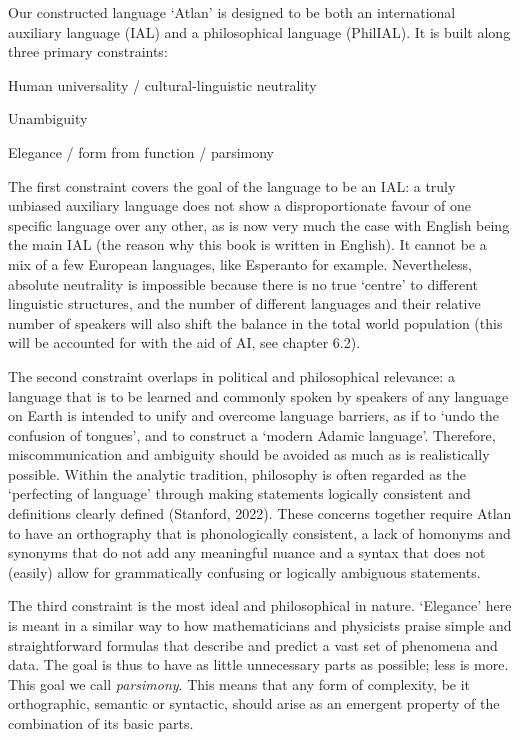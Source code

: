 Our constructed language ‘Atlan’ is designed to be both an international auxiliary language (IAL) and a philosophical language (PhilIAL). It is built along three primary constraints: 

\begin{enumerate}    
    \item {Human universality / cultural-linguistic neutrality 

    \item Unambiguity 

    \item Elegance / form from function / parsimony} 
\end{enumerate}

The first constraint covers the goal of the language to be an IAL: a truly unbiased auxiliary language does not show a disproportionate favour of one specific language over any other, as is now very much the case with English being the main IAL (the reason why this book is written in English). It cannot be a mix of a few European languages, like Esperanto for example. Nevertheless, absolute neutrality is impossible because there is no true ‘centre’ to different linguistic structures, and the number of different languages and their relative number of speakers will also shift the balance in the total world population (this will be accounted for with the aid of AI, see chapter 6.2). 

The second constraint overlaps in political and philosophical relevance: a language that is to be learned and commonly spoken by speakers of any language on Earth is intended to unify and overcome language barriers, as if to ‘undo the confusion of tongues’, and to construct a ‘modern Adamic language’. Therefore, miscommunication and ambiguity should be avoided as much as is realistically possible. Within the analytic tradition, philosophy is often regarded as the ‘perfecting of language’ through making statements logically consistent and definitions clearly defined (Stanford, 2022). These concerns together require Atlan to have an orthography that is phonologically consistent, a lack of homonyms and synonyms that do not add any meaningful nuance and a syntax that does not (easily) allow for grammatically confusing or logically ambiguous statements.  

The third constraint is the most ideal and philosophical in nature. ‘Elegance’ here is meant in a similar way to how mathematicians and physicists praise simple and straightforward formulas that describe and predict a vast set of phenomena and data. The goal is thus to have as little unnecessary parts as possible; less is more. This goal we call {\it parsimony}. This means that any form of complexity, be it orthographic, semantic or syntactic, should arise as an emergent property of the combination of its basic parts. 


